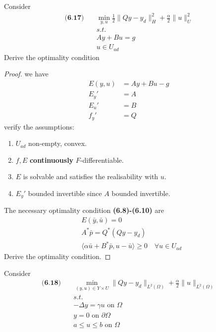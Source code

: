 \begin{example}
Consider 
\begin{align*}
	\textbf{(6.17)}\quad
	&\min_{y,u} \frac{1}{2}\|Qy - y_d\|_H^2 + \frac{\alpha}{2}\|u\|_U^2\\
	&s.t.\\
	&Ay + Bu = g \\
	&u \in U_{ad}
\end{align*}	
Derive the optimality condition
\begin{proof}
we have
\begin{align*}
	E(y, u) &= Ay + Bu - g\\
	E_y' &= A\\
	E_u' &= B\\
	f_y' &= Q
\end{align*}
verify the assumptions:
\begin{enumerate}
	\item $U_{ad}$ non-empty, convex. 
	\item $f, E$ \textbf{continuously} $F$-differentiable. \text{}
	\item $E$ is solvable and satisfies the realisability with $u$. 
	\item $E_y'$ bounded invertible since $A$ bounded invertible. 
\end{enumerate}
The necessary optimality condition \textbf{(6.8)-(6.10)} are
\begin{align*}
	&E(\bar{y}, \bar{u}) = 0\\
	&A^* \bar{p} = Q^*(Qy - y_d)\\
	&\langle \alpha \bar{u} + B^* \bar{p} , u - \bar{u} \rangle \ge 0 \quad \forall u \in U_{ad}
\end{align*}
Derive the optimality condition.
\end{proof}
\end{example}

\begin{example}
Consider 
\begin{align*}
	\textbf{(6.18)} \quad 
	&\min_{(y, u) \in Y \times U} \|Qy - y_d\|_{L^2(\Omega)} + \frac{\alpha}{2}\|u\|_{L^2(\Omega)}\\
	&s.t.\\
	&- \Delta y = \gamma u \text{ on } \Omega \\
	&y = 0 \text{ on } \partial \Omega\\
	&a \le u \le b \text{ on } \Omega
\end{align*}
	
\end{example}




